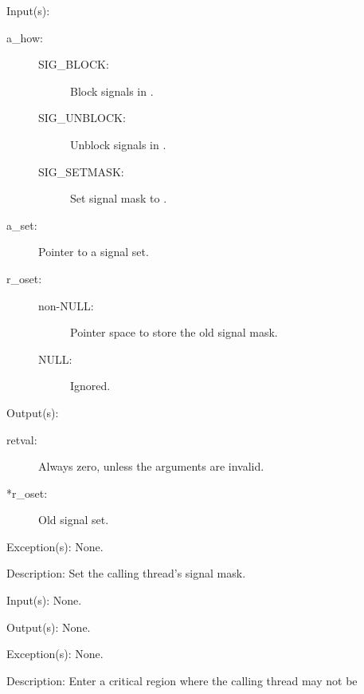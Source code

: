 \begin{capi}
\label{thd_sigmask}
	\begin{capilist}
	\item[Input(s): ]
		\begin{description}\item[]
		\item[a\_how: ]
			\begin{description}\item[]
			\item[SIG\_BLOCK: ]
				Block signals in .
			\item[SIG\_UNBLOCK: ]
				Unblock signals in .
			\item[SIG\_SETMASK: ]
				Set signal mask to .
			\end{description}
		\item[a\_set: ]
			Pointer to a signal set.
		\item[r\_oset: ]
			\begin{description}\item[]
			\item[non-NULL: ]
				Pointer space to store the old signal mask.
			\item[NULL: ]
				Ignored.
			\end{description}
		\end{description}
	\item[Output(s): ]
		\begin{description}\item[]
		\item[retval: ]
			Always zero, unless the arguments are invalid.
		\item[*r\_oset: ]
			Old signal set.
		\end{description}
	\item[Exception(s): ] None.
	\item[Description: ]
		Set the calling thread's signal mask.
	\end{capilist}
\label{thd_crit_enter}
	\begin{capilist}
	\item[Input(s): ] None.
	\item[Output(s): ] None.
	\item[Exception(s): ] None.
	\item[Description: ]
		Enter a critical region where the calling thread may not be

\end{capilist}
\end{capi}
